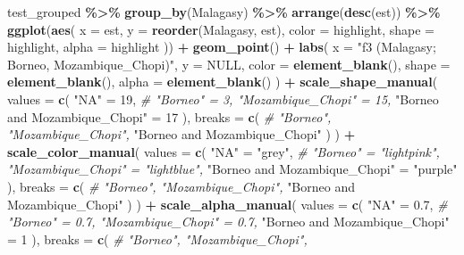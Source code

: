 \documentclass[
]{article}
\newenvironment{Shaded}{\begin{snugshade}}{\end{snugshade}}
\newcommand{\AttributeTok}[1]{\textcolor[rgb]{0.13,0.29,0.53}{#1}}
\newcommand{\CommentTok}[1]{\textcolor[rgb]{0.56,0.35,0.01}{\textit{#1}}}
\newcommand{\ConstantTok}[1]{\textcolor[rgb]{0.56,0.35,0.01}{#1}}
\newcommand{\DecValTok}[1]{\textcolor[rgb]{0.00,0.00,0.81}{#1}}
\newcommand{\FloatTok}[1]{\textcolor[rgb]{0.00,0.00,0.81}{#1}}
\newcommand{\FunctionTok}[1]{\textcolor[rgb]{0.13,0.29,0.53}{\textbf{#1}}}
\newcommand{\NormalTok}[1]{#1}
\newcommand{\OtherTok}[1]{\textcolor[rgb]{0.56,0.35,0.01}{#1}}
\newcommand{\SpecialCharTok}[1]{\textcolor[rgb]{0.81,0.36,0.00}{\textbf{#1}}}
\newcommand{\StringTok}[1]{\textcolor[rgb]{0.31,0.60,0.02}{#1}}
\begin{document}
\begin{Shaded}
\begin{Highlighting}[]
\NormalTok{test\_grouped }\SpecialCharTok{\%\textgreater{}\%}
  \FunctionTok{group\_by}\NormalTok{(Malagasy) }\SpecialCharTok{\%\textgreater{}\%}
  \FunctionTok{arrange}\NormalTok{(}\FunctionTok{desc}\NormalTok{(est)) }\SpecialCharTok{\%\textgreater{}\%}
  \FunctionTok{ggplot}\NormalTok{(}\FunctionTok{aes}\NormalTok{(}
    \AttributeTok{x =}\NormalTok{ est, }\AttributeTok{y =} \FunctionTok{reorder}\NormalTok{(Malagasy, est),}
    \AttributeTok{color =}\NormalTok{ highlight, }\AttributeTok{shape =}\NormalTok{ highlight, }\AttributeTok{alpha =}\NormalTok{ highlight}
\NormalTok{  )) }\SpecialCharTok{+}
  \FunctionTok{geom\_point}\NormalTok{() }\SpecialCharTok{+}
  \FunctionTok{labs}\NormalTok{(}
    \AttributeTok{x =} \StringTok{"f3 (Malagasy; Borneo, Mozambique\_Chopi)"}\NormalTok{, }\AttributeTok{y =} \ConstantTok{NULL}\NormalTok{,}
    \AttributeTok{color =} \FunctionTok{element\_blank}\NormalTok{(), }\AttributeTok{shape =} \FunctionTok{element\_blank}\NormalTok{(),}
    \AttributeTok{alpha =} \FunctionTok{element\_blank}\NormalTok{()}
\NormalTok{  ) }\SpecialCharTok{+}
  \FunctionTok{scale\_shape\_manual}\NormalTok{(}
    \AttributeTok{values =} \FunctionTok{c}\NormalTok{(}
      \StringTok{"NA"} \OtherTok{=} \DecValTok{19}\NormalTok{, }\CommentTok{\# "Borneo" = 3, "Mozambique\_Chopi" = 15,}
      \StringTok{"Borneo and Mozambique\_Chopi"} \OtherTok{=} \DecValTok{17}
\NormalTok{    ),}
    \AttributeTok{breaks =} \FunctionTok{c}\NormalTok{(}
      \CommentTok{\# "Borneo", "Mozambique\_Chopi",}
      \StringTok{"Borneo and Mozambique\_Chopi"}
\NormalTok{    )}
\NormalTok{  ) }\SpecialCharTok{+}
  \FunctionTok{scale\_color\_manual}\NormalTok{(}
    \AttributeTok{values =} \FunctionTok{c}\NormalTok{(}
      \StringTok{"NA"} \OtherTok{=} \StringTok{"grey"}\NormalTok{, }\CommentTok{\# "Borneo" = "lightpink", "Mozambique\_Chopi" = "lightblue",}
      \StringTok{"Borneo and Mozambique\_Chopi"} \OtherTok{=} \StringTok{"purple"}
\NormalTok{    ),}
    \AttributeTok{breaks =} \FunctionTok{c}\NormalTok{(}
      \CommentTok{\# "Borneo", "Mozambique\_Chopi",}
      \StringTok{"Borneo and Mozambique\_Chopi"}
\NormalTok{    )}
\NormalTok{  ) }\SpecialCharTok{+}
  \FunctionTok{scale\_alpha\_manual}\NormalTok{(}
    \AttributeTok{values =} \FunctionTok{c}\NormalTok{(}
      \StringTok{"NA"} \OtherTok{=} \FloatTok{0.7}\NormalTok{, }\CommentTok{\# "Borneo" = 0.7, "Mozambique\_Chopi" = 0.7,}
      \StringTok{"Borneo and Mozambique\_Chopi"} \OtherTok{=} \DecValTok{1}
\NormalTok{    ),}
    \AttributeTok{breaks =} \FunctionTok{c}\NormalTok{(}
      \CommentTok{\# "Borneo", "Mozambique\_Chopi",}

\end{Highlighting}
\end{Shaded}
\end{document}
